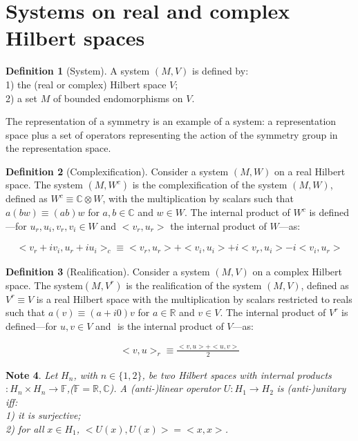 \documentclass[11pt]{book}
\begin{document}
\hypertarget{section:Systems}{%
\section{Systems on real and complex Hilbert
spaces}\label{section:Systems}}

\textbf{Definition 1} (System). A system \((M,V)\) is defined by:\\
1) the (real or complex) Hilbert space \(V\);\\
2) a set \(M\) of bounded endomorphisms on \(V\).

The representation of a symmetry is an example of a system: a
representation space plus a set of operators representing the action of
the symmetry group in the representation
space\cite{Kirillov2011Elements}.

\textbf{Definition 2} (Complexification). Consider a system \((M,W)\) on
a real Hilbert space. The system \((M,W^c)\) is the complexification of
the system \((M,W)\), defined as \(W^c\equiv  \mathbb{C}\otimes W\),
with the multiplication by scalars such that \(a(b w)\equiv (ab)w\) for
\(a,b\in \mathbb{C}\) and \(w\in W\). The internal product of \(W^c\) is
defined---for \(u_r,u_i,v_r,v_i\in W\) and \(<v_r,u_r>\) the internal
product of \(W\)---as:

\begin{equation}\begin{aligned}
<v_r+i v_i,u_r+i u_i>_c\equiv
<v_r,u_r>+<v_i,u_i>+i<v_r,u_i>-i<v_i,u_r>\end{aligned}\end{equation}

\textbf{Definition 3} (Realification). Consider a system \((M,V)\) on a
complex Hilbert space. The system\((M,V^r)\) is the realification of the
system \((M,V)\), defined as \(V^r\equiv V\) is a real Hilbert space
with the multiplication by scalars restricted to reals such that
\(a(v)\equiv (a+i0)v\) for \(a\in \mathbb{R}\) and \(v\in V\). The
internal product of \(V^r\) is defined---for \(u,v\in V\) and \(<v,u>\)
is the internal product of \(V\)---as:

\begin{equation}\begin{aligned}
<v,u>_r\equiv \frac{<v,u>+<u,v>}{2}\end{aligned}\end{equation}

\textbf{Note 4}. \emph{Let }\(H_n\)\emph{, with }\(n\in\{1,2\}\)\emph{,
be two Hilbert spaces with internal products }\(<,>:H_n\times H_n\to
\mathbb{F}\)\emph{,(}\(\mathbb{F}=\mathbb{R},\mathbb{C}\)\emph{). A
(anti-)linear operator }\(U:H_1\to H_2\)\emph{ is (anti-)unitary iff:}\\
\emph{1) it is surjective;}\\
\emph{2) for all }\(x\in H_1\)\emph{, }\(<U(x) , U(x)>=<x, x>\)\emph{.}
\end{document}
